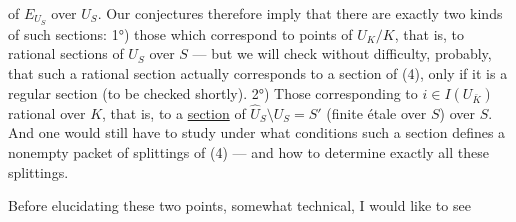 of $E_{U_S}$ over $U_S$. Our conjectures therefore imply that there are exactly two kinds of such sections: 1°) those which correspond to points of $U_K/K$, that is, to rational sections of $U_S$ over $S$ — but we will check without difficulty, probably, that such a rational section actually corresponds to a section of  (4), only if it is a  regular section (to be checked shortly). 2°) Those corresponding to $i\in I(U_{\bar K})$ rational over $K$, that is, to a \uline{section} of $\widehat U_S\setminus U_S=S'$ (finite étale over $S$) over $S$. And one would still have to study under what conditions such a section defines a nonempty packet of splittings of (4) — and how to determine exactly all these splittings.

Before elucidating these two points, somewhat technical, I would like to see

